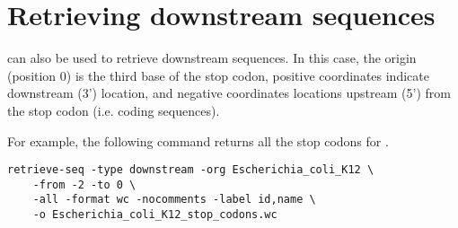 \section{Retrieving downstream sequences}

 can also be used to retrieve downstream
sequences. In this case, the origin (position 0) is the third base of
the stop codon, positive coordinates indicate downstream (3')
location, and negative coordinates locations upstream (5') from the
stop codon (i.e. coding sequences). 

For example, the following command returns all the stop codons for
.

{\color{Blue} \begin{footnotesize}
\begin{verbatim}
retrieve-seq -type downstream -org Escherichia_coli_K12 \
    -from -2 -to 0 \
    -all -format wc -nocomments -label id,name \
    -o Escherichia_coli_K12_stop_codons.wc
\end{verbatim} \end{footnotesize}
}








